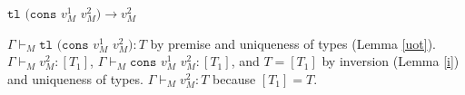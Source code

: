 \begin{case}
$\mathtt{tl}$ $(\mathtt{cons}$ $v_{M}^{1}$ $v_{M}^{2})\rightarrow v_{M}^{2}$

$\Gamma\vdash_{M}\mathtt{tl}$ $(\mathtt{cons}$ $v_{M}^{1}$ $v_{M}^{2}):T$ by premise and uniqueness of types (Lemma \ref{uot}).  $\Gamma\vdash_{M}v_{M}^{2}:[T_{1}]$, $\Gamma\vdash_{M}\mathtt{cons}$ $v_{M}^{1}$ $v_{M}^{2}:[T_{1}]$, and $T=[T_{1}]$ by inversion (Lemma \ref{i}) and uniqueness of types.  $\Gamma\vdash_{M}v_{M}^{2}:T$ because $[T_{1}]=T$.
\end{case}
